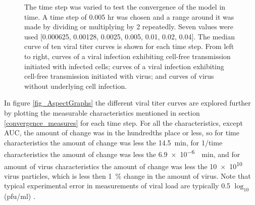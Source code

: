 \begin{figure}
{    }

\caption{The time step was varied to test the convergence of the model in time. A time step of 0.005 hr was chosen and a range around it was made by dividing or multiplying by 2 repeatedly. Seven values were used [0.000625, 0.00128, 0.0025, 0.005, 0.01, 0.02, 0.04]. The median curve of ten viral titer curves is shown for each time step. From left to right, curves of a viral infection exhibiting cell-free transmission initiated with infected cells; curves of a viral infection exhibiting cell-free transmission initiated with virus; and curves of virus without underlying cell infection. \label{fig:ViralTiterCurves}}
\end{figure}

In figure \ref{fig_AspectGraphs} the different viral titer curves are explored further by plotting the measurable characteristics mentioned in section \ref{convergence_measures} for each time step. For all the characteristics, except AUC, the amount of change was in the hundredths place or less, so for time characteristics the amount of change was less the \SI{14.5}{\minute}, for 1/time characteristics the amount of change was less the \SI{6.9e-6}{\per\minute}, and for amount of virus characteristics the amount of change was less the \num{10e10} virus particles, which is less then \SI{1}{\percent} change in the amount of virus. Note that typical experimental error in measurements of viral load are typically 0.5 $\log_{10}$(pfu/ml) \cite{labarre01}.

